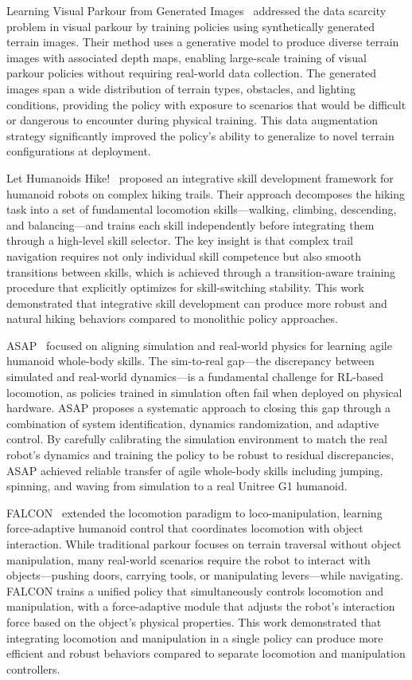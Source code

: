 Learning Visual Parkour from Generated Images~\cite{yu2024visualparkour} addressed the data scarcity problem in visual parkour by training policies using synthetically generated terrain images. Their method uses a generative model to produce diverse terrain images with associated depth maps, enabling large-scale training of visual parkour policies without requiring real-world data collection. The generated images span a wide distribution of terrain types, obstacles, and lighting conditions, providing the policy with exposure to scenarios that would be difficult or dangerous to encounter during physical training. This data augmentation strategy significantly improved the policy's ability to generalize to novel terrain configurations at deployment.

Let Humanoids Hike!~\cite{lin2024lethumanoids} proposed an integrative skill development framework for humanoid robots on complex hiking trails. Their approach decomposes the hiking task into a set of fundamental locomotion skills---walking, climbing, descending, and balancing---and trains each skill independently before integrating them through a high-level skill selector. The key insight is that complex trail navigation requires not only individual skill competence but also smooth transitions between skills, which is achieved through a transition-aware training procedure that explicitly optimizes for skill-switching stability. This work demonstrated that integrative skill development can produce more robust and natural hiking behaviors compared to monolithic policy approaches.

ASAP~\cite{he2024asap} focused on aligning simulation and real-world physics for learning agile humanoid whole-body skills. The sim-to-real gap---the discrepancy between simulated and real-world dynamics---is a fundamental challenge for RL-based locomotion, as policies trained in simulation often fail when deployed on physical hardware. ASAP proposes a systematic approach to closing this gap through a combination of system identification, dynamics randomization, and adaptive control. By carefully calibrating the simulation environment to match the real robot's dynamics and training the policy to be robust to residual discrepancies, ASAP achieved reliable transfer of agile whole-body skills including jumping, spinning, and waving from simulation to a real Unitree G1 humanoid.

FALCON~\cite{zhang2024falcon} extended the locomotion paradigm to loco-manipulation, learning force-adaptive humanoid control that coordinates locomotion with object interaction. While traditional parkour focuses on terrain traversal without object manipulation, many real-world scenarios require the robot to interact with objects---pushing doors, carrying tools, or manipulating levers---while navigating. FALCON trains a unified policy that simultaneously controls locomotion and manipulation, with a force-adaptive module that adjusts the robot's interaction force based on the object's physical properties. This work demonstrated that integrating locomotion and manipulation in a single policy can produce more efficient and robust behaviors compared to separate locomotion and manipulation controllers.

